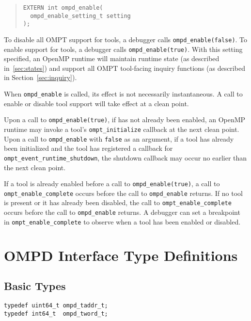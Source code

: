 \documentclass{article}
\begin{document}
\begin{quote}
\begin{verbatim}
EXTERN int ompd_enable(
  ompd_enable_setting_t setting
);
\end{verbatim}
\end{quote}

\noindent 
To disable all OMPT support for tools, a debugger calls \verb|ompd_enable(false)|.
To enable support for tools, 
a debugger  calls \verb|ompd_enable(true)|.
With this setting specified, an OpenMP runtime will maintain runtime state (as described in~\ref{sec:states}) and support all OMPT tool-facing inquiry functions (as described in Section~\ref{sec:inquiry}). 

When \verb|ompd_enable| is called, its effect is not necessarily instantaneous. A call to enable or disable tool support will take effect at a clean point.

Upon a call to \verb|ompd_enable(true)|, if has not already been enabled, an OpenMP runtime may invoke a tool's \verb|ompt_initialize| callback at the next clean point.
Upon a call to \verb|ompd_enable| with  \verb|false| as an argument,  if a  tool has already been initialized and the tool
has registered a callback for \verb|ompt_event_runtime_shutdown|, the shutdown callback may occur no earlier than the next clean point.

If a tool is already enabled before a call to \verb|ompd_enable(true)|, a call to \verb|ompt_enable_complete| occurs before the call to \verb|ompd_enable|  returns. 
If no tool is present or it has already been disabled, the call to \verb|ompt_enable_complete| occurs before the call to \verb|ompd_enable|  returns.
A debugger can set a breakpoint in  \verb|ompt_enable_complete|  to observe when a tool has been enabled or disabled.

\clearpage


\section{OMPD Interface Type Definitions}
\label{appendix:ompd-types}
\subsection{Basic Types}

\begin{verbatim}
typedef uint64_t ompd_taddr_t;
typedef int64_t  ompd_tword_t;
\end{verbatim}
\end{document}
